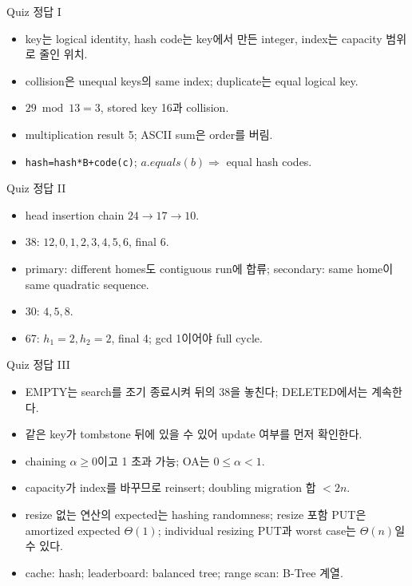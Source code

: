 \begin{frame}{Quiz 정답 I}
\small\begin{itemize}
\item key는 logical identity, hash code는 key에서 만든 integer, index는 capacity 범위로 줄인 위치.
\item collision은 unequal keys의 same index; duplicate는 equal logical key.
\item $29\bmod13=3$, stored key 16과 collision.
\item multiplication result 5; ASCII sum은 order를 버림.
\item \texttt{hash=hash*B+code(c)}; $a.equals(b)\Rightarrow$ equal hash codes.
\end{itemize}
\end{frame}
\begin{frame}{Quiz 정답 II}
\small\begin{itemize}
\item head insertion chain $24\to17\to10$.
\item 38: $12,0,1,2,3,4,5,6$, final 6.
\item primary: different homes도 contiguous run에 합류; secondary: same home이 same quadratic sequence.
\item 30: $4,5,8$.
\item 67: $h_1=2,h_2=2$, final 4; gcd 1이어야 full cycle.
\end{itemize}
\end{frame}
\begin{frame}{Quiz 정답 III}
\small\begin{itemize}
\item EMPTY는 search를 조기 종료시켜 뒤의 38을 놓친다; DELETED에서는 계속한다.
\item 같은 key가 tombstone 뒤에 있을 수 있어 update 여부를 먼저 확인한다.
\item chaining $\alpha\ge0$이고 1 초과 가능; OA는 $0\le\alpha<1$.
\item capacity가 index를 바꾸므로 reinsert; doubling migration 합 $<2n$.
\item resize 없는 연산의 expected는 hashing randomness; resize 포함 PUT은 amortized expected $\Theta(1)$; individual resizing PUT과 worst case는 $\Theta(n)$일 수 있다.
\item cache: hash; leaderboard: balanced tree; range scan: B-Tree 계열.
\end{itemize}
\end{frame}
